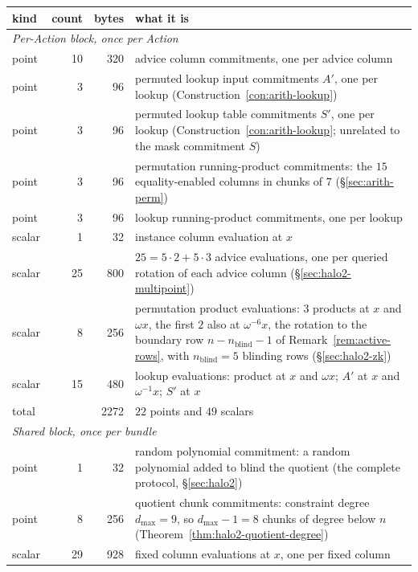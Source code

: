 \documentclass[11pt,a4paper]{article}
\theoremstyle{definition}
\begin{document}
\begin{table}[htbp]
\centering
\footnotesize
\begin{tabular}{l r r p{8.6cm}}
\toprule
kind & count & bytes & what it is \\
\midrule
\multicolumn{4}{l}{\emph{Per-Action block, once per Action}} \\
point  & 10 & 320 & advice column commitments, one per advice column \\
point  &  3 &  96 & permuted lookup input commitments $A'$, one per lookup
  (Construction~\ref{con:arith-lookup}) \\
point  &  3 &  96 & permuted lookup table commitments $S'$, one per lookup
  (Construction~\ref{con:arith-lookup}; unrelated to the mask
  commitment $S$) \\
point  &  3 &  96 & permutation running-product commitments: the $15$
  equality-enabled columns in chunks of $7$ (\S\ref{sec:arith-perm}) \\
point  &  3 &  96 & lookup running-product commitments, one per lookup \\
scalar &  1 &  32 & instance column evaluation at $x$ \\
scalar & 25 & 800 & $25 = 5 \cdot 2 + 5 \cdot 3$ advice evaluations, one per
  queried rotation of each advice column (\S\ref{sec:halo2-multipoint}) \\
scalar &  8 & 256 & permutation product evaluations: $3$ products at $x$ and
  $\omega x$, the first $2$ also at $\omega^{-6}x$, the rotation to the
  boundary row $n - n_{\mathrm{blind}} - 1$ of
  Remark~\ref{rem:active-rows}, with $n_{\mathrm{blind}} = 5$ blinding
  rows (\S\ref{sec:halo2-zk}) \\
scalar & 15 & 480 & lookup evaluations: product at $x$ and $\omega x$; $A'$
  at $x$ and $\omega^{-1}x$; $S'$ at $x$ \\
\multicolumn{2}{l}{total} & 2272 & $22$ points and $49$ scalars \\
\midrule
\multicolumn{4}{l}{\emph{Shared block, once per bundle}} \\
point  &  1 &  32 & random polynomial commitment: a random polynomial
  added to blind the quotient (the complete protocol, \S\ref{sec:halo2}) \\
point  &  8 & 256 & quotient chunk commitments: constraint degree
  $d_{\max} = 9$, so $d_{\max} - 1 = 8$ chunks of degree below $n$
  (Theorem~\ref{thm:halo2-quotient-degree}) \\
scalar & 29 & 928 & fixed column evaluations at $x$, one per fixed column \\

\end{tabular}
\end{table}
\end{document}
